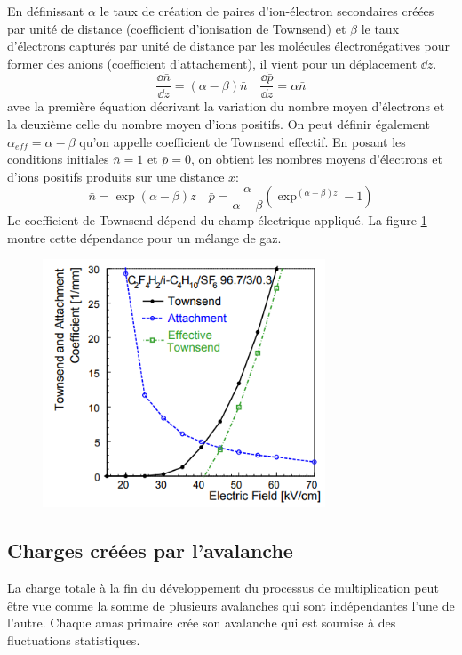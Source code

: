 En définissant $\alpha$ le taux de création de paires d'ion-électron secondaires créées par unité de distance (coefficient d'ionisation de Townsend) et  $\beta$ le taux d'électrons capturés par unité de distance par les molécules électronégatives pour former des anions (coefficient d'attachement), il vient pour un déplacement  $\dd z$.
\begin{equation}
	\frac{\dd \bar{n}}{\dd z}=(\alpha-\beta)\bar{n} \quad  \frac{\dd \bar{p}}{\dd z}=\alpha\bar{n} 
\end{equation}
avec la première équation décrivant la variation du nombre moyen d'électrons et la deuxième celle du nombre moyen d'ions positifs. On peut définir également $\alpha_{eff}=\alpha-\beta$ qu'on appelle coefficient de Townsend effectif. En posant les conditions initiales $\bar{n}=1$ et $\bar{p}=0$, on obtient les nombres moyens d'électrons et d'ions positifs produits sur une distance $x$: 
\begin{equation}
\bar{n}=\exp(\alpha-\beta)z \quad \bar{p}=\frac{\alpha}{\alpha-\beta}\left(\exp^{(\alpha-\beta)z}-1\right)
\end{equation}
Le coefficient de Townsend dépend du champ électrique appliqué. La figure \ref{tow} montre cette dépendance pour un mélange de gaz.
\begin{figure}[h!]
	\centering
	\includegraphics[width=0.75\textwidth]{RPC/tow.png}
	\label{tow}
\end{figure}


\subsection{Charges créées par l'avalanche}
La charge totale à la fin du développement du processus de multiplication peut être vue comme la somme de plusieurs avalanches qui sont indépendantes l'une de l'autre. Chaque amas primaire crée son avalanche qui est soumise à des fluctuations statistiques.

